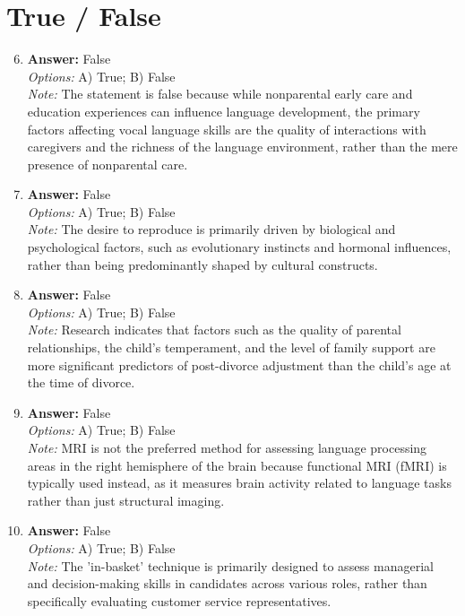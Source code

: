 \documentclass[12pt]{article}
\begin{document}
\section*{True / False}
\begin{enumerate}[label=\arabic*.]
\setcounter{enumi}{5}
\item \textbf{Answer:} False
\\ \textit{Options:} A) True; B) False
\\ \textit{Note:} The statement is false because while nonparental early care and education experiences can influence language development, the primary factors affecting vocal language skills are the quality of interactions with caregivers and the richness of the language environment, rather than the mere presence of nonparental care.
\item \textbf{Answer:} False
\\ \textit{Options:} A) True; B) False
\\ \textit{Note:} The desire to reproduce is primarily driven by biological and psychological factors, such as evolutionary instincts and hormonal influences, rather than being predominantly shaped by cultural constructs.
\item \textbf{Answer:} False
\\ \textit{Options:} A) True; B) False
\\ \textit{Note:} Research indicates that factors such as the quality of parental relationships, the child's temperament, and the level of family support are more significant predictors of post-divorce adjustment than the child's age at the time of divorce.
\item \textbf{Answer:} False
\\ \textit{Options:} A) True; B) False
\\ \textit{Note:} MRI is not the preferred method for assessing language processing areas in the right hemisphere of the brain because functional MRI (fMRI) is typically used instead, as it measures brain activity related to language tasks rather than just structural imaging.
\item \textbf{Answer:} False
\\ \textit{Options:} A) True; B) False
\\ \textit{Note:} The 'in-basket' technique is primarily designed to assess managerial and decision-making skills in candidates across various roles, rather than specifically evaluating customer service representatives.
\end{enumerate}
\end{document}
